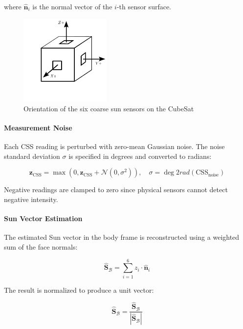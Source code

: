 where $\hat{\mathbf{n}}_i$ is the normal vector of the $i$-th sensor surface.

\begin{figure}[H]
    \centering
    \includegraphics[width=0.4\textwidth]{figures/modelling/CSS.pdf}
    \caption{Orientation of the six coarse sun sensors on the CubeSat}
    \label{fig:CSS}
\end{figure}

\paragraph{Measurement Noise}

Each CSS reading is perturbed with zero-mean Gaussian noise. The noise standard deviation $\sigma$ is specified in degrees and converted to radians:

\begin{equation}
    \mathbf{z}_{\text{CSS}} = \max\left( 0, \mathbf{z}_{\text{CSS}} + \mathcal{N}(0, \sigma^2) \right), \quad \sigma = \deg2rad(\text{CSS}_{\text{noise}})
\end{equation}

Negative readings are clamped to zero since physical sensors cannot detect negative intensity.

\paragraph{Sun Vector Estimation}

The estimated Sun vector in the body frame is reconstructed using a weighted sum of the face normals:

\begin{equation}
    \hat{\mathbf{S}}_\mathcal{B} = \sum_{i=1}^{6} z_i \cdot \hat{\mathbf{n}}_i
\end{equation}

The result is normalized to produce a unit vector:

\begin{equation}
    \hat{\mathbf{S}}_\mathcal{B} = \frac{\hat{\mathbf{S}}_\mathcal{B}}{|\hat{\mathbf{S}}_\mathcal{B}|}
\end{equation}


